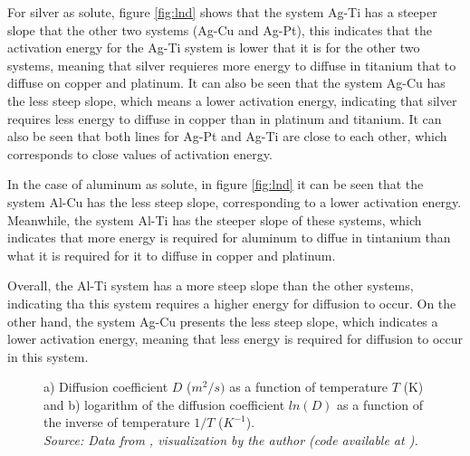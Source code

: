 For silver as solute, figure \ref{fig:lnd} shows that the system Ag-Ti has a steeper slope that the other two systems (Ag-Cu and Ag-Pt), this indicates that the activation energy for the Ag-Ti system is lower that it is for the other two systems, meaning that silver requieres more energy to diffuse in titanium that to diffuse on copper and platinum. It can also be seen that the system Ag-Cu has the less steep slope, which means a lower activation energy, indicating that silver requires less energy to diffuse in copper than in platinum and titanium. It can also be seen that both lines for Ag-Pt and Ag-Ti are close to each other, which corresponds to close values of activation energy.

In the case of aluminum as solute, in figure \ref{fig:lnd} it can be seen that the system Al-Cu has the less steep slope, corresponding to a lower activation energy. Meanwhile, the system Al-Ti has the steeper slope of these systems, which indicates that more energy is required for aluminum to diffue in tintanium than what it is required for it to diffuse in copper and platinum.

Overall, the Al-Ti system has a more steep slope than the other systems, indicating tha this system requires a higher energy for diffusion to occur. On the other hand, the system Ag-Cu presents the less steep slope, which indicates a lower activation energy, meaning that less energy is required for diffusion to occur in this system.

\begin{figure}[h]
 \centering
 \caption{a) Diffusion coefficient $D$ ($m^2/s)$ as a function of temperature $T$ (K) and b) logarithm of the diffusion coefficient $ln(D)$ as a function of the inverse of temperature $1/T$ ($K^{-1}$). \\
 \textit{Source: Data from \citep{kakusan}, visualization by the author (code available at \citep{mygit}).}}
 \label{fig:diffusion}
\end{figure}